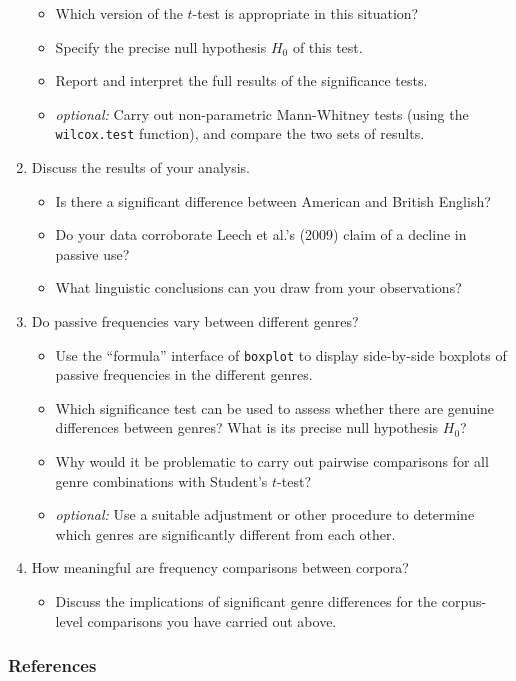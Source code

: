 \documentclass[a4paper,12pt]{article}
\begin{document}
\begin{enumerate}[topsep=0em]
\begin{itemize}[nosep]
  \item Which version of the $t$-test is appropriate in this situation?
  \item Specify the precise null hypothesis $H_0$ of this test.
  \item Report and interpret the full results of the significance tests.
  \item \emph{optional:} Carry out non-parametric Mann-Whitney tests (using the \texttt{wilcox.test} function), and compare the two sets of results.
  \end{itemize}
\item Discuss the results of your analysis.
  \begin{itemize}[nosep]
  \item Is there a significant difference between American and British English?
  \item Do your data corroborate Leech et al.'s (2009) claim of a decline in passive use?
  \item What linguistic conclusions can you draw from your observations?   
  \end{itemize}
\item Do passive frequencies vary between different genres?
  \begin{itemize}[nosep]
  \item Use the ``formula'' interface of \texttt{boxplot} to display side-by-side boxplots of passive frequencies in the different genres.
  \item Which significance test can be used to assess whether there are genuine differences between genres? What is its precise null hypothesis $H_0$?
  \item Why would it be problematic to carry out pairwise comparisons for all genre combinations with Student's $t$-test?
  \item \emph{optional:} Use a suitable adjustment or other procedure to determine which genres are significantly different from each other.
  \end{itemize}
\item How meaningful are frequency comparisons between corpora?
  \begin{itemize}[nosep]
  \item Discuss the implications of significant genre differences for the corpus-level comparisons you have carried out above.
  \end{itemize}
\end{enumerate}


\subsubsection*{References}
\end{document}

